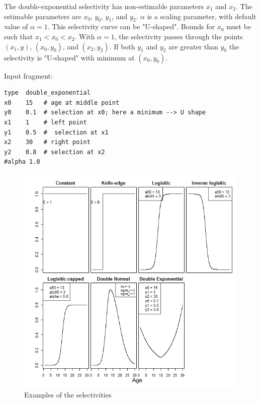 The double-exponential selectivity has non-estimable parameters $x_1$ and $x_2$. The estimable parameters are $x_0$, $y_0$, $y_1$, and $y_2$.  $\alpha$ is a scaling parameter, with default value of $\alpha = 1$. This selectivity curve can be "U-shaped". Bounds for $x_0$ must be such that $x_1 < x_0 < x_2$. With $\alpha=1$, the selectivity passes through the points $(x_1, y)$, $(x_0, y_0)$, and $(x_2, y_2)$. If both $y_1$ and $y_2$ are greater than $y_0$ the selectivity is "U-shaped" with minimum at $(x_0, y_0)$.

Input fragment: {\small{\begin{verbatim}
type  double_exponential
x0    15   # age at middle point 
y0    0.1  # selection at x0; here a minimum --> U shape
x1    1    # left point
y1    0.5  #  selection at x1
x2    30   # right point
y2    0.8  # selection at x2
#alpha 1.0
\end{verbatim}}}

%
%

\begin{figure}[H]
	\includegraphics[scale = 0.7]{Figures/Selectivities.jpeg}
	\caption{Examples of the selectivities}
	\label{fig:select examples}
\end{figure}


